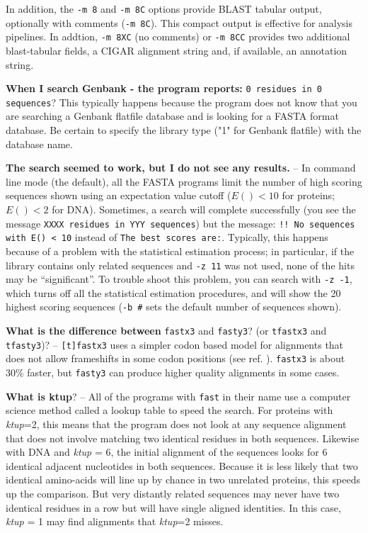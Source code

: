 \documentclass[11pt]{article}
\begin{document}
In addition, the \texttt{-m 8} and \texttt{-m 8C} options provide
BLAST tabular output, optionally with comments (\texttt{-m 8C}). This
compact output is effective for analysis pipelines.  In addtion,
\texttt{-m 8XC} (no comments) or \texttt{-m 8CC} provides two
additional blast-tabular fields, a CIGAR alignment string and, if
available, an annotation string.

{\noindent}\textbf{When I search Genbank - the program reports:} \texttt{0 residues in 0
sequences}?  This typically happens because the program does not
know that you are searching a Genbank flatfile database and is looking
for a FASTA format database.  Be certain to specify the library type
("1" for Genbank flatfile) with the database name.

{\noindent}\textbf{The search seemed to work, but I do not see any results.} -- In
command line mode (the default), all the FASTA programs limit the
number of high scoring sequences shown using an expectation value
cutoff ($E()<10$ for proteins; $E()<2$ for DNA).  Sometimes, a search
will complete successfully (you see the message \texttt{XXXX residues
  in YYY sequences}) but the message: \texttt{!! No sequences with E()
  < 10} instead of \texttt{The best scores are:}.  Typically, this
happens because of a problem with the statistical estimation process;
in particular, if the library contains only related sequences and
\texttt{-z 11} was not used, none of the hits may be ``significant''.
To trouble shoot this problem, you can search with \texttt{-z -1},
which turns off all the statistical estimation procedures, and will
show the 20 highest scoring sequences (\texttt{-b \#} sets the default
number of sequences shown).

{\noindent}\textbf{What is the difference between} \texttt{fastx3} and
\texttt{fasty3}? (or \texttt{tfastx3} and \texttt{tfasty3})? --
\texttt{[t]fastx3} uses a simpler codon based model for alignments
that does not allow frameshifts in some codon positions (see
ref. \cite{wrp971}).  \texttt{fastx3} is about 30\% faster, but
\texttt{fasty3} can produce higher quality alignments in some cases.

\vspace{0.5ex}
{\noindent}\textbf{What is ktup}? -- All of the programs with \texttt{fast} in their
name use a computer science method called a lookup table to speed the
search.  For proteins with \emph{ktup}=2, this means that the program
does not look at any sequence alignment that does not involve matching
two identical residues in both sequences.  Likewise with DNA and
\emph{ktup} = 6, the initial alignment of the sequences looks for 6
identical adjacent nucleotides in both sequences.  Because it is less
likely that two identical amino-acids will line up by chance in two
unrelated proteins, this speeds up the comparison.  But very distantly
related sequences may never have two identical residues in a row but
will have single aligned identities.  In this case, \emph{ktup} = 1 may
find alignments that \emph{ktup}=2 misses.
\end{document}
